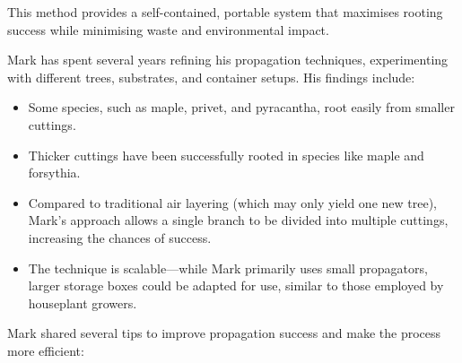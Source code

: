 This method provides a self\--contained, portable system that maximises rooting success while minimising waste and environmental impact.

\medskip

\noindent
Mark has spent several years refining his propagation techniques, experimenting with different trees, substrates, and container setups.
His findings include:

\begin{itemize}
    \item Some species, such as maple, privet, and pyracantha, root easily from smaller cuttings.

    \item Thicker cuttings have been successfully rooted in species like maple and forsythia.

    \item Compared to traditional air layering (which may only yield one new tree), Mark's approach allows a single branch to be divided into multiple cuttings, increasing the chances of success.

    \item The technique is scalable---while Mark primarily uses small propagators, larger storage boxes could be adapted for use, similar to those employed by houseplant growers.
\end{itemize}

\medskip

\noindent
Mark shared several tips to improve propagation success and make the process more efficient:

